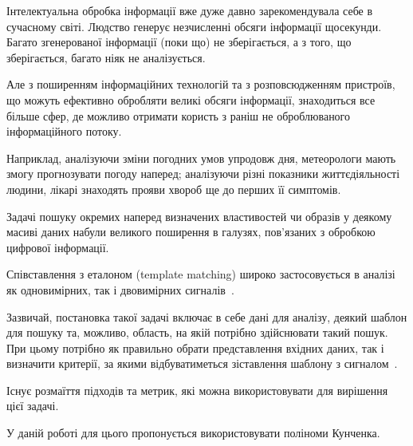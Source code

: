 \intro{}
Інтелектуальна обробка інформації вже дуже давно зарекомендувала себе в сучасному світі.
Людство генерує незчисленні обсяги інформації щосекунди.
Багато згенерованої інформації (поки що) не зберігається, а з того, що зберігається, багато ніяк не аналізується.

Але з поширенням інформаційних технологій та з розповсюдженням пристроїв, що можуть ефективно обробляти великі обсяги
інформації, знаходиться все більше сфер, де можливо отримати користь з раніш не оброблюваного інформаційного потоку.

Наприклад, аналізуючи зміни погодних умов упродовж дня, метеорологи мають змогу прогнозувати погоду наперед;
аналізуючи різні показники життєдіяльності людини, лікарі знаходять прояви хвороб ще до перших її симптомів.

Задачі пошуку окремих наперед визначених властивостей чи образів у деякому масиві даних набули великого поширення в
галузях, пов’язаних з обробкою цифрової інформації.

Співставлення з еталоном (template matching) широко застосовується в аналізі як одновимірних, так і двовимірних
сигналів~\cite{book4}.

Зазвичай, постановка такої задачі включає в себе дані для аналізу, деякий шаблон для пошуку та, можливо, область, на
якій потрібно здійснювати такий пошук.  При цьому потрібно як правильно обрати представлення вхідних даних, так і
визначити критерії, за якими відбуватиметься зіставлення шаблону з сигналом~\cite{book10}.

Існує розмаїття підходів та метрик, які можна використовувати для вирішення цієї задачі.

У даній роботі для цього пропонується використовувати поліноми Кунченка.

